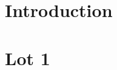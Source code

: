 \documentclass[asi]{picInsa}
\title{\PTI{}}
\author{\Michel} %
\begin{document}
\couverture{}

 \informationsGenerales{}


\tableofcontents

\setcounter{chapter}{0}

\chapter*{Introduction}
\label{introduction}


\chapter{Lot 1}
\label{lot1}


\pageGarde{}
\end{document}

